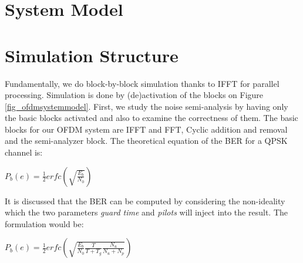 \section{System Model}
\label{sec_systemmodel}


\section{Simulation Structure}
\label{sec_simstruct}
Fundamentally, we do block-by-block simulation thanks to IFFT for parallel processing. Simulation is done by (de)activation of the blocks on Figure \ref{fig_ofdmsystemmodel}.
First, we study the noise semi-analysis by having only the basic blocks activated and also to examine the correctness of them. The basic blocks for our OFDM system are IFFT and FFT, Cyclic addition and removal and the semi-analyzer block. 
The theoretical equation of the BER for a QPSK channel is:\\
\begin{center} 
$P_{b}(e)= \frac{1}{2}erfc(\sqrt{\frac{E_{b}}{N_{0}}})$\\
\end{center}
It is discussed that the BER can be computed by considering the non-ideality which the two parameters \textit{guard time} and \textit{pilots} will inject into the result. The formulation would be:\\
\begin{center}
 $P_{b}(e)= \frac{1}{2}erfc(\sqrt{\frac{E_{b}}{N_{0}}\frac{T}{T+T_{g}}\frac{N_{u}}{N_{u}+N_{p}}})$\\
\end{center}

